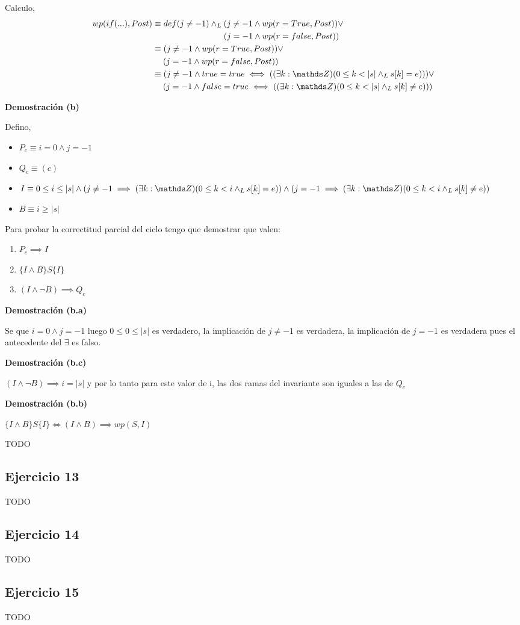 Calculo,
\begin{align*}
    wp(if(...), Post) &\equiv def(j \neq -1) \yLuego (j \neq -1 \wedge wp(r = True, Post)) \vee \\
    &\qquad \qquad \qquad \qquad \; \:( j = -1 \wedge wp(r = false, Post)) \\
    &\equiv (j \neq -1 \wedge wp(r = True, Post)) \vee \\
    &\quad \;( j = -1 \wedge wp(r = false, Post)) \\
    &\equiv (j \neq -1 \wedge true = true \iff ((\exists k: \ent)(0 \leq k < |s| \yLuego s[k]=e))) \vee \\
    &\quad \;( j = -1 \wedge false = true \iff ((\exists k: \ent)(0 \leq k < |s| \yLuego s[k]\neq e)))
\end{align*}

\textbf{Demostración (b)}

Defino,
\begin{itemize}
    \item $ P_c \equiv i = 0 \wedge j = -1 $
    \item $ Q_c \equiv (c) $
    \item $ I \equiv 0 \leq i \leq |s| \wedge (j \neq -1 \implies (\exists k: \ent)(0 \leq k < i \yLuego s[k]=e)) \wedge (j = -1 \implies (\exists k: \ent)(0 \leq k < i \yLuego s[k]\neq e)) $
    \item $ B \equiv i \geq |s| $
\end{itemize}
Para probar la correctitud parcial del ciclo tengo que demostrar que valen:
\begin{enumerate}[label=(\alph*)]
    \item $ P_c \implies I $
    \item $ \{ I \wedge B \} S \{ I \} $
    \item $ (I \wedge \neg B) \implies Q_c $
\end{enumerate}

\textbf{Demostración (b.a)}

Se que $ i = 0 \wedge j = -1 $ luego $ 0 \leq 0 \leq |s| $ es verdadero, la implicación de $ j \neq -1 $ es verdadera, la implicación de $ j = -1 $ es verdadera pues el antecedente del $ \exists $ es falso.

\textbf{Demostración (b.c)}

$ (I \wedge \neg B) \implies i = |s| $ y por lo tanto para este valor de i, las dos ramas del invariante son iguales a las de $ Q_c $

\textbf{Demostración (b.b)}

$ \{ I \wedge B \} S \{ I \} \iff (I \wedge B) \implies wp(S, I) $

TODO

\subsection{Ejercicio 13}
TODO

\subsection{Ejercicio 14}
TODO

\subsection{Ejercicio 15}
TODO

